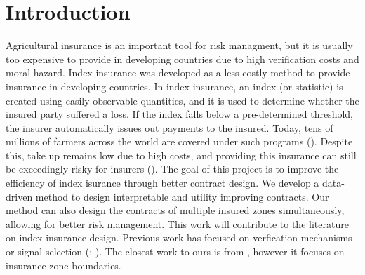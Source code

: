 \documentclass[12pt]{article}
\begin{document}
\section{Introduction}
Agricultural insurance is an important tool for risk managment, but it is usually too expensive to provide in developing countries due to high verification costs and moral hazard. Index insurance was developed as a less costly method to provide insurance in developing countries. In index insurance, an index (or statistic) is created using easily observable quantities, and it is used to determine whether the insured party suffered a loss. If the index falls below a pre-determined threshold, the insurer automatically issues out payments to the insured. Today, tens of millions of farmers across the world are covered under such programs (\cite{greatrex2015scaling}). Despite this, take up remains low due to high costs, and providing this insurance can still be exceedingly risky for insurers (\cite{jensen2017agricultural}). The goal of this project is to improve the efficiency of index isurance through better contract design. We develop a data-driven method to design interpretable and utility improving contracts. Our method can also design the contracts of multiple insured zones simultaneously, allowing for better risk management. This work will contribute to the literature on index insurance design. Previous work has focused on verfication mechanisms or signal selection (\cite{jensen2016index}; \cite{elabed2013managing}). The closest work to ours is from \cite{estefania2024breaking}, however it focuses on insurance zone boundaries. 
\end{document}
